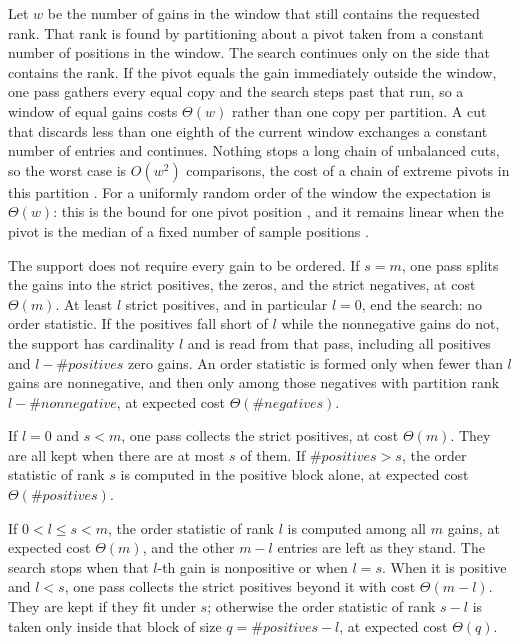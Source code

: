 \documentclass[11pt,a4paper]{article}
\theoremstyle{plain}
\theoremstyle{definition}
\theoremstyle{remark}
\begin{document}
Let \(w\) be the number of gains in the window that still contains the requested rank.
That rank is found by partitioning about a pivot taken from a constant number of positions in the window.
The search continues only on the side that contains the rank.
If the pivot equals the gain immediately outside the window, one pass gathers every equal copy and the search steps past that run, so a window of equal gains costs \(\Theta(w)\) rather than one copy per partition.
A cut that discards less than one eighth of the current window exchanges a constant number of entries and continues.
Nothing stops a long chain of unbalanced cuts, so the worst case is \(O(w^2)\) comparisons, the cost of a chain of extreme pivots in this partition \cite[\S5.2.2]{knuth1998}.
For a uniformly random order of the window the expectation is \(\Theta(w)\): this is the bound for one pivot position \cite[Ex.~5.2.2--32]{knuth1998}, and it remains linear when the pivot is the median of a fixed number of sample positions \cite{kirschenhofer1997,grubel1999}.

The support does not require every gain to be ordered.
If \(s=m\), one pass splits the gains into the strict positives, the zeros, and the strict negatives, at cost \(\Theta(m)\).
At least \(l\) strict positives, and in particular \(l=0\), end the search: no order statistic.
If the positives fall short of \(l\) while the nonnegative gains do not, the support has cardinality \(l\) and is read from that pass, including all positives and \(l-\#positives\) zero gains.
An order statistic is formed only when fewer than \(l\) gains are nonnegative, and then only among those negatives with partition rank \(l-\#nonnegative\), at expected cost \(\Theta(\#negatives)\).

If \(l=0\) and \(s<m\), one pass collects the strict positives, at cost \(\Theta(m)\).
They are all kept when there are at most \(s\) of them.
If \(\#positives>s\), the order statistic of rank \(s\) is computed in the positive block alone, at expected cost \(\Theta(\#positives)\).

If \(0<l\leq s<m\), the order statistic of rank \(l\) is computed among all \(m\) gains, at expected cost \(\Theta(m)\), and the other \(m-l\) entries are left as they stand.
The search stops when that \(l\)-th gain is nonpositive or when \(l=s\).
When it is positive and \(l<s\), one pass collects the strict positives beyond it with cost \(\Theta(m-l)\).
They are kept if they fit under \(s\); otherwise the order statistic of rank \(s-l\) is taken only inside that block of size \(q=\#positives-l\), at expected cost \(\Theta(q)\).
\end{document}
